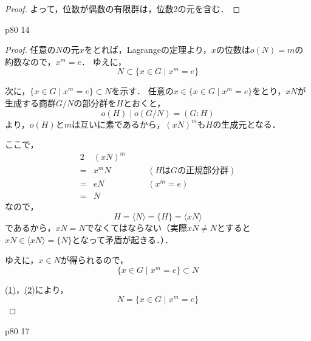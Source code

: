 \documentclass[dvipdfmx,uplatex,11pt]{jsarticle}
\theoremstyle{mytheorem}
\begin{document}
\begin{leftbar}
\begin{proof}
                よって，位数が偶数の有限群は，位数2の元を含む．
            \end{proof}
        \end{leftbar}
        \newpage
        p80 14 
        \begin{leftbar}
            \begin{proof}
                任意の$N$の元$x$をとれば，Lagrangeの定理より，$x$の位数は$o(N)=m$の約数なので，$x^m=e$．
                ゆえに，
                \begin{equation}
                    \label{eq:p80 14 1}
                    N \subset \{ x \in G \mid x^m=e \}
                \end{equation}

                次に，$\{x \in G \mid x^m=e\} \subset N$を示す．
                任意の$x \in \{ x \in G \mid x^m=e\}$をとり，$xN$が生成する商群$G / N$の部分群を$H$とおくと，
                \[
                    o(H) \mid o(G/N)=(G:H)
                \]
                より，$o(H)$と$m$は互いに素であるから，$(xN)^m$も$H$の生成元となる．

                ここで，
                \begin{alignat*}{2}
                    & (xN)^m & & \\
                    =& x^m N & \quad & (\text{$H$は$G$の正規部分群})\\
                    =& eN & \quad & (x^m =e) \\
                    =& N
                \end{alignat*}
                なので，
                \[
                    H = \langle N \rangle =\{H\} = \langle xN \rangle 
                \]
                であるから，$xN =N$でなくてはならない（実際$xN \ne N$とすると$x N \in \langle xN \rangle =\{N\}$となって矛盾が起きる．）．

                ゆえに，$x \in N$が得られるので，
                \begin{equation}
                    \label{eq:p80 14 2}
                    \{x \in G \mid x^m =e\} \subset N
                \end{equation}
                
                \hyperref[eq:p80 14 1]{(1)}，\hyperref[eq:p80 14 2]{(2)}により，
                \[
                    N = \{ x \in G \mid x^m=e \}
                \]
            \end{proof}
        \end{leftbar}
        \newpage
        p80 17
\end{document}
